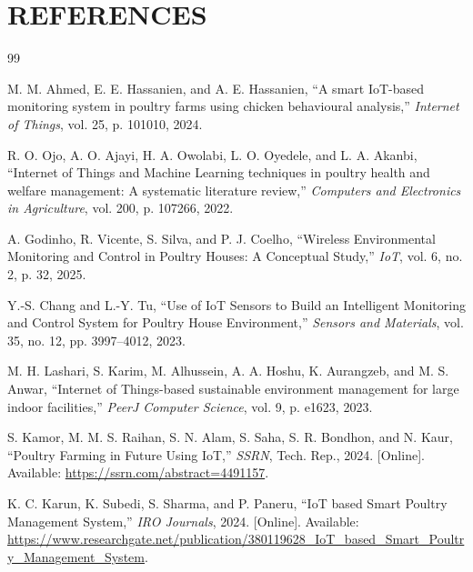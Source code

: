 \documentclass[../main.tex]{subfiles}
\begin{document}
    \section*{REFERENCES}
\begingroup
\renewcommand{\section}[2]{} %

\begin{thebibliography}{99}

M. M. Ahmed, E. E. Hassanien, and A. E. Hassanien, ``A smart IoT-based monitoring system in poultry farms using chicken behavioural analysis,'' \textit{Internet of Things}, vol. 25, p. 101010, 2024.

R. O. Ojo, A. O. Ajayi, H. A. Owolabi, L. O. Oyedele, and L. A. Akanbi, ``Internet of Things and Machine Learning techniques in poultry health and welfare management: A systematic literature review,'' \textit{Computers and Electronics in Agriculture}, vol. 200, p. 107266, 2022.

A. Godinho, R. Vicente, S. Silva, and P. J. Coelho, ``Wireless Environmental Monitoring and Control in Poultry Houses: A Conceptual Study,'' \textit{IoT}, vol. 6, no. 2, p. 32, 2025.

Y.-S. Chang and L.-Y. Tu, ``Use of IoT Sensors to Build an Intelligent Monitoring and Control System for Poultry House Environment,'' \textit{Sensors and Materials}, vol. 35, no. 12, pp. 3997--4012, 2023.

M. H. Lashari, S. Karim, M. Alhussein, A. A. Hoshu, K. Aurangzeb, and M. S. Anwar, ``Internet of Things-based sustainable environment management for large indoor facilities,'' \textit{PeerJ Computer Science}, vol. 9, p. e1623, 2023.

S. Kamor, M. M. S. Raihan, S. N. Alam, S. Saha, S. R. Bondhon, and N. Kaur, ``Poultry Farming in Future Using IoT,'' \textit{SSRN}, Tech. Rep., 2024. [Online]. Available: \url{https://ssrn.com/abstract=4491157}.

K. C. Karun, K. Subedi, S. Sharma, and P. Paneru, ``IoT based Smart Poultry Management System,'' \textit{IRO Journals}, 2024. [Online]. Available: \url{https://www.researchgate.net/publication/380119628_IoT_based_Smart_Poultry_Management_System}.


\end{thebibliography}
\end{document}
